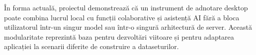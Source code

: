 În forma actuală, proiectul demonstrează că un instrument de adnotare desktop poate combina lucrul local cu funcții colaborative și asistență AI fără a bloca utilizatorul într-un singur model sau într-o singură arhitectură de server. Această modularitate reprezintă baza pentru dezvoltări viitoare și pentru adaptarea aplicației la scenarii diferite de construire a dataseturilor.
